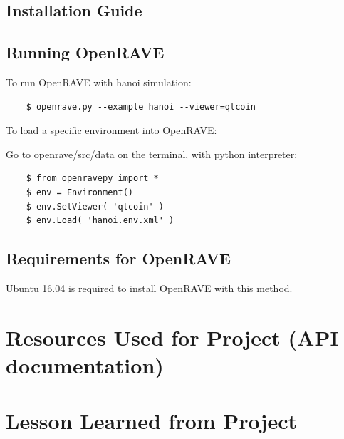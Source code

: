 \documentclass[10pt,journal,compsoc,draftclsnofoot]{IEEEtran}
\begin{document}
\begin{flushleft}
\newpage

\subsection{Installation Guide}


\newpage

\subsection{Running OpenRAVE}

To run OpenRAVE with hanoi simulation:

\begin{lstlisting}
    $ openrave.py --example hanoi --viewer=qtcoin
\end{lstlisting}

To load a specific environment into OpenRAVE:

Go to openrave/src/data on the terminal, with python interpreter:
\begin{lstlisting}
    $ from openravepy import *
    $ env = Environment()
    $ env.SetViewer( 'qtcoin' )	
    $ env.Load( 'hanoi.env.xml' )
\end{lstlisting}

\subsection{Requirements for OpenRAVE}
Ubuntu 16.04 is required to install OpenRAVE with this method.

\section{Resources Used for Project (API documentation)}


\newpage

\section{Lesson Learned from Project}


\end{flushleft}
\end{document}
